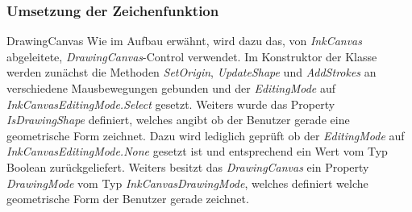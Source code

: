 \subsubsection{Umsetzung der Zeichenfunktion}

DrawingCanvas
Wie im Aufbau erwähnt, wird dazu das, von \textit{InkCanvas} abgeleitete, \textit{DrawingCanvas}-Control verwendet. Im Konstruktor der Klasse werden zunächst die Methoden \textit{SetOrigin}, \textit{UpdateShape} und \textit{AddStrokes} an verschiedene Mausbewegungen gebunden und der \textit{EditingMode} auf \textit{InkCanvasEditingMode.Select} gesetzt. Weiters wurde das Property \textit{IsDrawingShape} definiert, welches angibt ob der Benutzer gerade eine geometrische Form zeichnet. Dazu wird lediglich geprüft ob der \textit{EditingMode} auf \textit{InkCanvasEditingMode.None} gesetzt ist und entsprechend ein Wert vom Typ Boolean zurückgeliefert. Weiters besitzt das \textit{DrawingCanvas} ein Property \textit{DrawingMode} vom Typ \textit{InkCanvasDrawingMode}, welches definiert welche geometrische Form der Benutzer gerade zeichnet.
